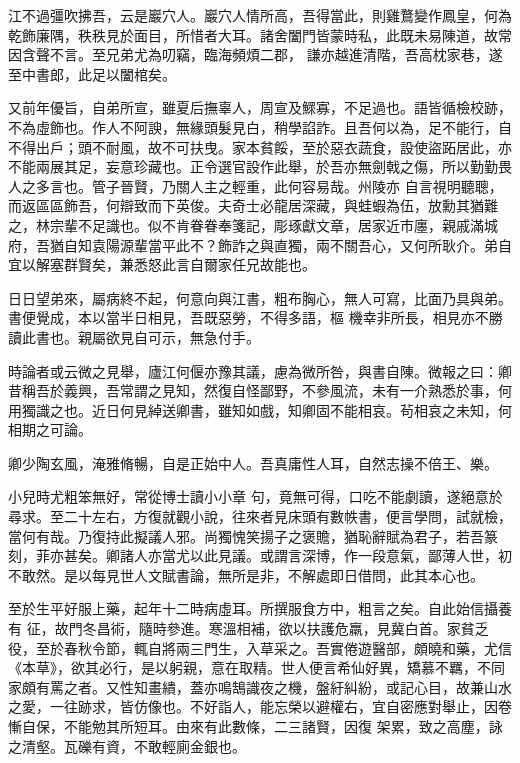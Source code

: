 \begin{pinyinscope}
 江不過彊吹拂吾，云是巖穴人。巖穴人情所高，吾得當此，則雞鶩變作鳳皇，何為乾飾廉隅，秩秩見於面目，所惜者大耳。諸舍闔門皆蒙時私，此既未易陳道，故常因含聲不言。至兄弟尤為叨竊，臨海頻煩二郡，
 謙亦越進清階，吾高枕家巷，遂至中書郎，此足以闔棺矣。



 又前年優旨，自弟所宣，雖夏后撫辜人，周宣及鰥寡，不足過也。語皆循檢校跡，不為虛飾也。作人不阿諛，無緣頭髮見白，稍學諂詐。且吾何以為，足不能行，自不得出戶；頭不耐風，故不可扶曳。家本貧餒，至於惡衣蔬食，設使盜跖居此，亦不能兩展其足，妄意珍藏也。正令選官設作此舉，於吾亦無劍戟之傷，所以勤勤畏人之多言也。管子晉賢，乃關人主之輕重，此何容易哉。州陵亦
 自言視明聽聰，而返區區飾吾，何辯致而下英俊。夫奇士必龍居深藏，與蛙蝦為伍，放勳其猶難之，林宗輩不足識也。似不肯眷眷奉箋記，彫琢獻文章，居家近市廛，親戚滿城府，吾猶自知袁陽源輩當平此不？飾詐之與直獨，兩不關吾心，又何所耿介。弟自宜以解塞群賢矣，兼悉怒此言自爾家任兄故能也。



 日日望弟來，屬病終不起，何意向與江書，粗布胸心，無人可寫，比面乃具與弟。書便覺成，本以當半日相見，吾既惡勞，不得多語，樞
 機幸非所長，相見亦不勝讀此書也。親屬欲見自可示，無急付手。



 時論者或云微之見舉，廬江何偃亦豫其議，慮為微所咎，與書自陳。微報之曰：卿昔稱吾於義興，吾常謂之見知，然復自怪鄙野，不參風流，未有一介熟悉於事，何用獨識之也。近日何見綽送卿書，雖知如戲，知卿固不能相哀。茍相哀之未知，何相期之可論。



 卿少陶玄風，淹雅脩暢，自是正始中人。吾真庸性人耳，自然志操不倍王、樂。



 小兒時尤粗笨無好，常從博士讀小小章
 句，竟無可得，口吃不能劇讀，遂絕意於尋求。至二十左右，方復就觀小說，往來者見床頭有數帙書，便言學問，試就檢，當何有哉。乃復持此擬議人邪。尚獨愧笑揚子之褒贍，猶恥辭賦為君子，若吾篆刻，菲亦甚矣。卿諸人亦當尤以此見議。或謂言深博，作一段意氣，鄙薄人世，初不敢然。是以每見世人文賦書論，無所是非，不解處即日借問，此其本心也。



 至於生平好服上藥，起年十二時病虛耳。所撰服食方中，粗言之矣。自此始信攝養有
 征，故門冬昌術，隨時參進。寒溫相補，欲以扶護危羸，見冀白首。家貧乏役，至於春秋令節，輒自將兩三門生，入草采之。吾實倦遊醫部，頗曉和藥，尤信《本草》，欲其必行，是以躬親，意在取精。世人便言希仙好異，矯慕不羈，不同家頗有罵之者。又性知畫繢，蓋亦鳴鵠識夜之機，盤紆糾紛，或記心目，故兼山水之愛，一往跡求，皆仿像也。不好詣人，能忘榮以避權右，宜自密應對舉止，因卷慚自保，不能勉其所短耳。由來有此數條，二三諸賢，因復
 架累，致之高塵，詠之清壑。瓦礫有資，不敢輕廁金銀也。




\end{pinyinscope}

